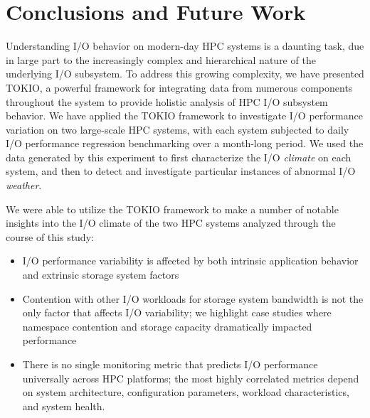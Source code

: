 \section{Conclusions and Future Work} \label{sec:conclusions}

Understanding I/O behavior on modern-day HPC systems is a daunting task, due in large part to the increasingly complex and hierarchical nature of the underlying I/O subsystem.
To address this growing complexity, we have presented TOKIO, a powerful framework for integrating data from numerous components throughout the system to provide holistic analysis of HPC I/O subsystem behavior.
We have applied the TOKIO framework to investigate I/O performance variation on two large-scale HPC systems, with each system subjected to daily I/O performance regression benchmarking over a month-long period.
We used the data generated by this experiment to first characterize the I/O \emph{climate} on each system, and then to detect and investigate particular instances of abnormal I/O \emph{weather}.

We were able to utilize the TOKIO framework to make a number of notable insights into the I/O climate of the two HPC systems analyzed through the course of this study:

\begin{itemize}
\item I/O performance variability is affected by both intrinsic application behavior and extrinsic storage system factors
\item Contention with other I/O workloads for storage system bandwidth is not the only factor that affects I/O variability; %
we highlight case studies where namespace contention and storage capacity dramatically impacted performance
\item There is no single monitoring metric that predicts I/O performance
universally across HPC platforms; the most highly correlated metrics depend
on system architecture, configuration parameters, workload characteristics,
and system health.
\end{itemize}


